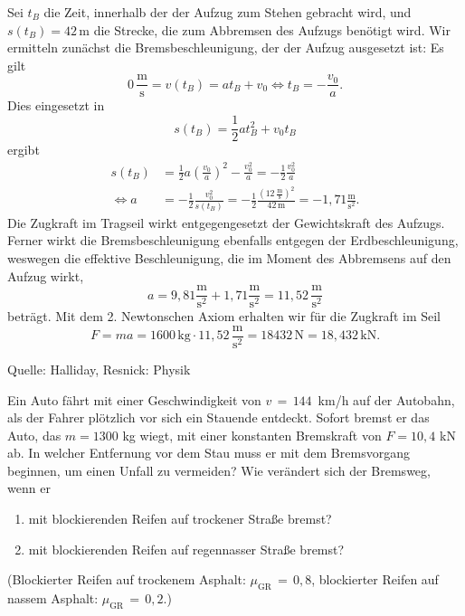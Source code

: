 \begin{MExercises}
\begin{MExercise}
               \begin{MSolution}
               Sei $t_B$ die Zeit, innerhalb der der Aufzug zum Stehen gebracht wird, und $s(t_B)=42 \,\text{m}$ die Strecke, die zum Abbremsen des Aufzugs ben\"otigt wird. Wir ermitteln zun\"achst die Bremsbeschleunigung, der der Aufzug ausgesetzt ist: Es gilt
               $$
               0\,\frac{\text{m}}{\text{s}}=v(t_B)=a t_B+v_0\Leftrightarrow t_B=-\frac{v_0}{a}.
               $$ Dies eingesetzt in 
               $$
               s(t_B)=\frac{1}{2}at_B^2+v_0t_B
               $$ergibt
               \begin{eqnarray*}
               s(t_B)&=\frac{1}{2}a\left(\frac{v_0}{a}\right)^2-\frac{v_0^2}{a}=-\frac{1}{2}\frac{v_0^2}{a}\\ 
               \Leftrightarrow a&=-\frac{1}{2}\frac{v_0^2}{s(t_B)}=-\frac{1}{2}\frac{\left(12\,\frac{\text{m}}{\text{s}}\right)^2}{42 \,\text{m}}=-1,71\frac{\text{m}}{\text{s}^2}.
               \end{eqnarray*}
               Die Zugkraft im Tragseil wirkt entgegengesetzt der Gewichtskraft des Aufzugs. Ferner wirkt die Bremsbeschleunigung ebenfalls entgegen der Erdbeschleunigung, weswegen die effektive Beschleunigung, die im Moment des Abbremsens auf den Aufzug wirkt,
               $$
               a={9,81}\frac{\text{m}}{\text{s}^2}+{1,71}\frac{\text{m}}{\text{s}^2}={11,52}\,\frac{\text{m}}{\text{s}^2}
               $$betr\"agt. Mit dem 2. Newtonschen Axiom erhalten wir f\"ur die Zugkraft im Seil
               $$
               F=ma=1600\,\text{kg}\cdot {11,52}\,\frac{\text{m}}{\text{s}^2}=18432\,\text{N}={18,432}\,\text{kN.}
               $$
               \end{MSolution}
               
               Quelle: Halliday, Resnick: Physik
               \end{MExercise}
               
               \begin{MExercise}
               Ein Auto f\"ahrt mit einer Geschwindigkeit von $v\,=\,144$~km/h auf der Autobahn, als der Fahrer pl\"otzlich vor sich ein Stauende entdeckt. Sofort bremst er das Auto, das $m=1300$ kg wiegt, mit einer konstanten Bremskraft von $F={10,4}$ kN ab. In welcher Entfernung vor dem Stau muss er mit dem Bremsvorgang beginnen, um einen Unfall zu vermeiden? Wie ver\"andert sich der Bremsweg, wenn er
               \begin{enumerate}
               \item mit blockierenden Reifen auf trockener Stra{\ss}e bremst?
               \item mit blockierenden Reifen auf regennasser Stra{\ss}e bremst? 
               \end{enumerate}
               (Blockierter Reifen auf trockenem Asphalt: $\mu_{\text{GR}}\,=\,{0,8}$, blockierter Reifen auf nassem Asphalt: $\mu_{\text{GR}}\,=\,{0,2}$.)
               

\end{MExercise}
\end{MExercises}
